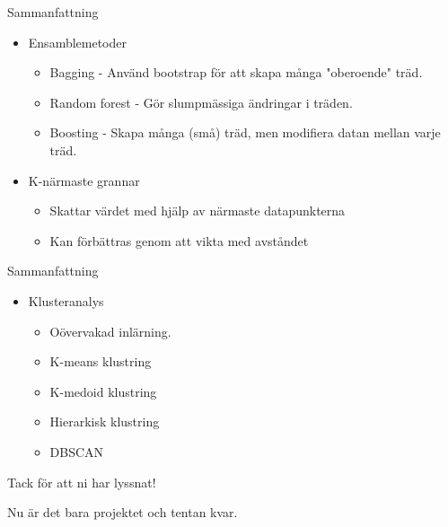 \documentclass[10pt,english]{beamer}
\begin{document}
\begin{frame}{Sammanfattning}
    
    \begin{itemize}
        \item Ensamblemetoder
        \begin{itemize}
            \item Bagging - Använd bootstrap för att skapa många "oberoende" träd.
            \item Random forest - Gör slumpmässiga ändringar i träden.
            \item Boosting - Skapa många (små) träd, men modifiera datan mellan varje träd.
        \end{itemize}
        \item K-närmaste grannar
        \begin{itemize}
            \item Skattar värdet med hjälp av närmaste datapunkterna
            \item Kan förbättras genom att vikta med avståndet
        \end{itemize}
    \end{itemize}

\end{frame}

\begin{frame}{Sammanfattning}
    
    \begin{itemize}
        \item Klusteranalys
        \begin{itemize}
            \item Oövervakad inlärning.
            \item K-means klustring
            \item K-medoid klustring
            \item Hierarkisk klustring
            \item DBSCAN
        \end{itemize}
    \end{itemize}

\end{frame}



\begin{frame}[standout]
    \LARGE Tack för att ni har lyssnat!

    \large Nu är det bara projektet och tentan kvar.
\end{frame}
\end{document}
